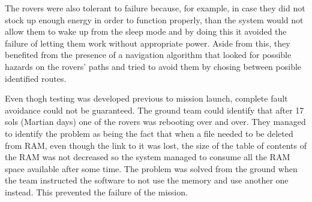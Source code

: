 The rovers were also tolerant to failure because, for example, in case they did
not stock up enough energy in order to function properly, than the system would
not allow them to wake up from the sleep mode and by doing this it avoided the
failure of letting them work without appropriate power. Aside from this, they
benefited from the presence of a navigation algorithm that looked for possible
hazards on the rovers' paths and tried to avoid them by chosing between posible
identified routes.

Even thogh testing was developed previous to mission launch, complete fault
avoidance could not be guaranteed. The ground team could identify that after 17
sols (Martian days) one of the rovers was rebooting over and over. They managed
to identify the problem as being the fact that when a file needed to be deleted
from RAM, even though the link to it was lost, the size of the table of contents
of the RAM was not decreased so the system managed to consume all the RAM space
available after some time. The problem was solved from the ground when the team
instructed the software to not use the memory and use another one instead. This
prevented the failure of the mission.
